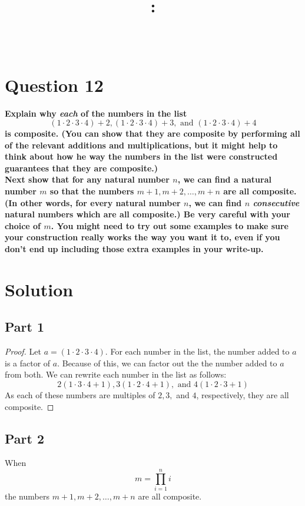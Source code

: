 \documentclass[article, 12pt]{article}
\title{
    \vspace{2in}
    \textmd{\textbf{\courseNumber: \courseName}}
    \normalsize\vspace{0.1in}\\
    \vspace{0.1in}\Large{\text{\psetName}} \\
    \vspace{0.1in}\large{\text{\professor}}
    \vspace{3in}
}
\author{\name}
\date{\dueDate}
\theoremstyle{definition}
\begin{document}
    \maketitle
    \thispagestyle{empty}
    \pagebreak

    \section*{Question 12}
    \textbf{Explain why \textit{each} of the numbers in the list}
    \[ (1 \cdot 2 \cdot 3 \cdot 4) + 2, (1 \cdot 2 \cdot 3 \cdot 4) + 3, \text{ and } (1 \cdot 2 \cdot 3 \cdot 4) + 4\]
    \textbf{is composite. (You can show that they are composite by performing all of the relevant additions and multiplications, but it might help to think about how he way the numbers in the list were constructed guarantees that they are composite.)}
    \\[12pt]
    \textbf{Next show that for any natural number $n$, we can find a natural number $m$ so that the numbers $m+1,m+2,\dots,m+n$ are all composite. (In other words, for every natural number $n$, we can find $n$ \textit{consecutive} natural numbers which are all composite.) Be very careful with your choice of $m$. You might need to try out some examples to make sure your construction really works the way you want it to, even if you don't end up including those extra examples in your write-up.}

    \section*{Solution}
    \subsection*{Part 1}
    \begin{proof}
        Let $a = (1 \cdot 2 \cdot 3 \cdot 4)$. For each number in the list, the number added to $a$ is a factor of $a$. Because of this, we can factor out the the number added to $a$ from both. We can rewrite each number in the list as follows:
        \[ 2(1 \cdot 3 \cdot 4 + 1), 3(1 \cdot 2 \cdot 4 + 1), \text{ and } 4(1 \cdot 2 \cdot 3 + 1) \]
        As each of these numbers are multiples of $2,3,$ and $4$, respectively, they are all composite.
    \end{proof}
    \subsection*{Part 2}
    When  
    \[ m = \prod_{i=1}^{n} i \]
    the numbers $m+1,m+2,\dots,m+n$ are all composite.
\end{document}
